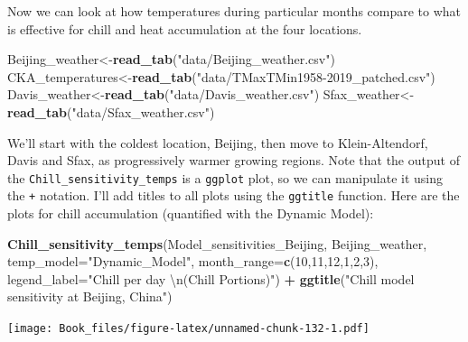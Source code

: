 \documentclass[
]{book}
\newenvironment{Shaded}{\begin{snugshade}}{\end{snugshade}}
\newcommand{\CharTok}[1]{\textcolor[rgb]{0.31,0.60,0.02}{#1}}
\newcommand{\DataTypeTok}[1]{\textcolor[rgb]{0.13,0.29,0.53}{#1}}
\newcommand{\DecValTok}[1]{\textcolor[rgb]{0.00,0.00,0.81}{#1}}
\newcommand{\KeywordTok}[1]{\textcolor[rgb]{0.13,0.29,0.53}{\textbf{#1}}}
\newcommand{\NormalTok}[1]{#1}
\newcommand{\OperatorTok}[1]{\textcolor[rgb]{0.81,0.36,0.00}{\textbf{#1}}}
\newcommand{\StringTok}[1]{\textcolor[rgb]{0.31,0.60,0.02}{#1}}
\begin{document}
Now we can look at how temperatures during particular months compare to what is effective for chill and heat accumulation at the four locations.

\begin{Shaded}
\begin{Highlighting}[]
\NormalTok{Beijing_weather<-}\KeywordTok{read_tab}\NormalTok{(}\StringTok{"data/Beijing_weather.csv"}\NormalTok{)}
\NormalTok{CKA_temperatures<-}\KeywordTok{read_tab}\NormalTok{(}\StringTok{"data/TMaxTMin1958-2019_patched.csv"}\NormalTok{)}
\NormalTok{Davis_weather<-}\KeywordTok{read_tab}\NormalTok{(}\StringTok{"data/Davis_weather.csv"}\NormalTok{)}
\NormalTok{Sfax_weather<-}\KeywordTok{read_tab}\NormalTok{(}\StringTok{"data/Sfax_weather.csv"}\NormalTok{)}
\end{Highlighting}
\end{Shaded}

We'll start with the coldest location, Beijing, then move to Klein-Altendorf, Davis and Sfax, as progressively warmer growing regions. Note that the output of the \texttt{Chill\_sensitivity\_temps} is a \texttt{ggplot} plot, so we can manipulate it using the \texttt{+} notation. I'll add titles to all plots using the \texttt{ggtitle} function.
Here are the plots for chill accumulation (quantified with the Dynamic Model):

\begin{Shaded}
\begin{Highlighting}[]
\KeywordTok{Chill_sensitivity_temps}\NormalTok{(Model_sensitivities_Beijing,}
\NormalTok{                        Beijing_weather,}
                        \DataTypeTok{temp_model=}\StringTok{"Dynamic_Model"}\NormalTok{,}
                        \DataTypeTok{month_range=}\KeywordTok{c}\NormalTok{(}\DecValTok{10}\NormalTok{,}\DecValTok{11}\NormalTok{,}\DecValTok{12}\NormalTok{,}\DecValTok{1}\NormalTok{,}\DecValTok{2}\NormalTok{,}\DecValTok{3}\NormalTok{),}
                        \DataTypeTok{legend_label=}\StringTok{"Chill per day }\CharTok{\textbackslash{}n}\StringTok{(Chill Portions)"}\NormalTok{) }\OperatorTok{+}
\StringTok{  }\KeywordTok{ggtitle}\NormalTok{(}\StringTok{"Chill model sensitivity at Beijing, China"}\NormalTok{)}
\end{Highlighting}
\end{Shaded}

\texttt{[image: Book\_files/figure-latex/unnamed-chunk-132-1.pdf]}
\end{document}
